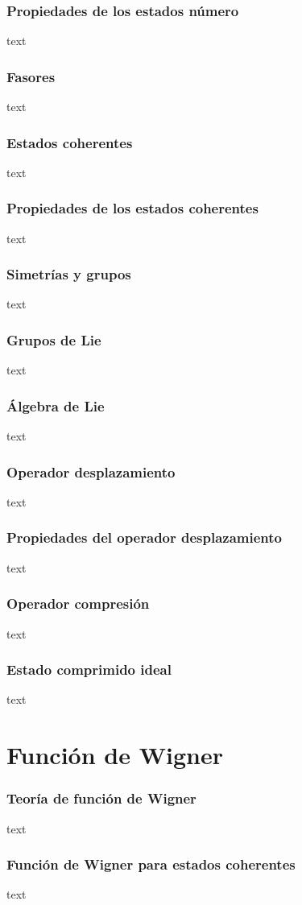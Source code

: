 \documentclass[xcolor=dvipsnames,slidestop,compress,mathserif, 11pt]{beamer}
\begin{document}
\begin{frame}[c]
	\frametitle{Propiedades de los estados número}
	text
\end{frame}

\begin{frame}[c]
	\frametitle{Fasores}
	text
\end{frame}

\begin{frame}[c]
	\frametitle{Estados coherentes}
	text
\end{frame}

\begin{frame}[c]
	\frametitle{Propiedades de los estados coherentes}
	text
\end{frame}

\begin{frame}[c]
	\frametitle{Simetrías y grupos}
	text
\end{frame}

\begin{frame}[c]
	\frametitle{Grupos de Lie}
	text
\end{frame}

\begin{frame}[c]
	\frametitle{Álgebra de Lie}
	text
\end{frame}

\begin{frame}[c]
	\frametitle{Operador desplazamiento}
	text
\end{frame}

\begin{frame}[c]
	\frametitle{Propiedades del operador desplazamiento}
	text
\end{frame}

\begin{frame}[c]
	\frametitle{Operador compresión}
	text
\end{frame}

\begin{frame}[c]
	\frametitle{Estado comprimido ideal}
	text
\end{frame}

\section{Función de Wigner}

\begin{frame}[c]
	\frametitle{Teoría de función de Wigner}
	text
\end{frame}

\begin{frame}[c]
	\frametitle{Función de Wigner para estados coherentes}
	text
\end{frame}
\end{document}
